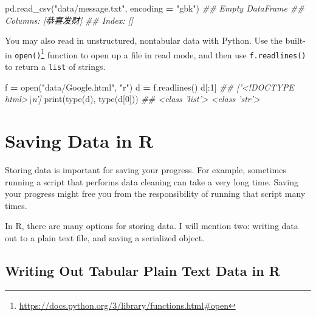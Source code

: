 \documentclass[12pt,krantz2]{krantz}
\makeatletter
\newenvironment{Shaded}{\begin{snugshade}}{\end{snugshade}}
\newcommand{\BuiltInTok}[1]{#1}
\newcommand{\CommentTok}[1]{\textcolor[rgb]{0.37,0.37,0.37}{\textit{#1}}}
\newcommand{\DecValTok}[1]{\textcolor[rgb]{0.06,0.06,0.06}{#1}}
\newcommand{\NormalTok}[1]{#1}
\newcommand{\OperatorTok}[1]{\textcolor[rgb]{0.43,0.43,0.43}{\textbf{#1}}}
\newcommand{\StringTok}[1]{\textcolor[rgb]{0.5,0.5,0.5}{#1}}
\renewcommand{\href}[2]{#2\footnote{\url{#1}}}
\newenvironment{kframe}{%
\medskip{}
\setlength{\fboxsep}{.8em}
 \def\at@end@of@kframe{}%
 \ifinner\ifhmode%
  \def\at@end@of@kframe{\end{minipage}}%
  \begin{minipage}{\columnwidth}%
 \fi\fi%
 \def\FrameCommand##1{\hskip\@totalleftmargin \hskip-\fboxsep
 \colorbox{shadecolor}{##1}\hskip-\fboxsep
     \hskip-\linewidth \hskip-\@totalleftmargin \hskip\columnwidth}%
 \MakeFramed {\advance\hsize-\width
   \@totalleftmargin\z@ \linewidth\hsize
   \@setminipage}}%
 {\par\unskip\endMakeFramed%
 \at@end@of@kframe}
\renewenvironment{Shaded}{\begin{kframe}}{\end{kframe}}
\makeatother
\begin{document}
\begin{Shaded}
\begin{Highlighting}[]
\NormalTok{pd.read_csv(}\StringTok{"data/message.txt"}\NormalTok{, encoding }\OperatorTok{=} \StringTok{"gbk"}\NormalTok{)}
\CommentTok{## Empty DataFrame}
\CommentTok{## Columns: [恭喜发财]}
\CommentTok{## Index: []}
\end{Highlighting}
\end{Shaded}

You may also read in unstructured, nontabular data with Python. Use the built-in \href{https://docs.python.org/3/library/functions.html\#open}{\texttt{open()}} function to open up a file in read mode, and then use \texttt{f.readlines()} to return a \texttt{list} of strings.

\begin{Shaded}
\begin{Highlighting}[]
\NormalTok{f }\OperatorTok{=} \BuiltInTok{open}\NormalTok{(}\StringTok{"data/Google.html"}\NormalTok{, }\StringTok{"r"}\NormalTok{)}
\NormalTok{d }\OperatorTok{=}\NormalTok{ f.readlines()}
\NormalTok{d[:}\DecValTok{1}\NormalTok{]}
\CommentTok{## ['<!DOCTYPE html>\textbackslash{}n']}
\BuiltInTok{print}\NormalTok{(}\BuiltInTok{type}\NormalTok{(d), }\BuiltInTok{type}\NormalTok{(d[}\DecValTok{0}\NormalTok{]))}
\CommentTok{## <class 'list'> <class 'str'>}
\end{Highlighting}
\end{Shaded}

\hypertarget{saving-data-in-r}{%
\section{Saving Data in R}\label{saving-data-in-r}}

Storing data is important for saving your progress. For example, sometimes running a script that performs data cleaning can take a very long time. Saving your progress might free you from the responsibility of running that script many times.

In R, there are many options for storing data. I will mention two: writing data out to a plain text file, and saving a serialized object.

\hypertarget{writing-out-tabular-plain-text-data-in-r}{%
\subsection{Writing Out Tabular Plain Text Data in R}\label{writing-out-tabular-plain-text-data-in-r}}
\end{document}
